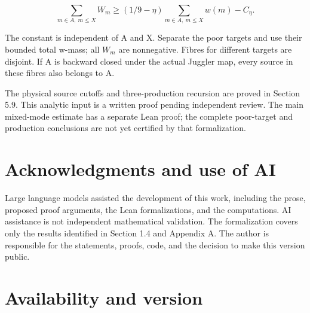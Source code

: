 \documentclass[11pt,a4paper]{article}
\begin{document}
\[
 \sum_{m\in A,\ m\le X} W_m
    \ge (1/9-\eta)\sum_{m\in A,\ m\le X}w(m)-C_\eta.
 \tag{E.24}
\]

The constant is independent of A and X. Separate the poor targets and
use their bounded total w-mass; all \(W_m\) are nonnegative. Fibres for
different targets are disjoint. If A is backward closed under the actual
Juggler map, every source in these fibres also belongs to A.

The physical source cutoffs and three-production recursion are proved in
Section 5.9. This analytic input is a written proof pending independent
review. The main mixed-mode estimate has a separate Lean proof; the
complete poor-target and production conclusions are not yet certified by
that formalization.

\section{Acknowledgments and use of
AI}\label{acknowledgments-and-use-of-ai}

Large language models assisted the development of this work, including
the prose, proposed proof arguments, the Lean formalizations, and the
computations. AI assistance is not independent mathematical validation.
The formalization covers only the results identified in Section 1.4 and
Appendix A. The author is responsible for the statements, proofs, code,
and the decision to make this version public.

\section{Availability and version}\label{availability-and-version}
\end{document}
